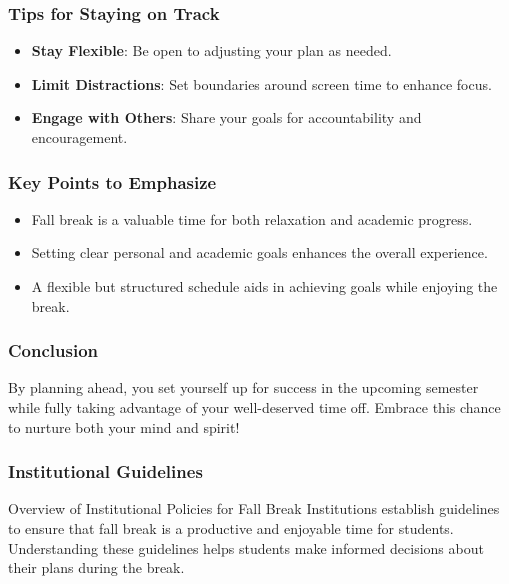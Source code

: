 \documentclass[aspectratio=169]{beamer}
\begin{document}
\begin{frame}[fragile]
    \frametitle{Tips for Staying on Track}
    \begin{itemize}
        \item \textbf{Stay Flexible}: Be open to adjusting your plan as needed.
        \item \textbf{Limit Distractions}: Set boundaries around screen time to enhance focus.
        \item \textbf{Engage with Others}: Share your goals for accountability and encouragement.
    \end{itemize}
\end{frame}

\begin{frame}[fragile]
    \frametitle{Key Points to Emphasize}
    \begin{itemize}
        \item Fall break is a valuable time for both relaxation and academic progress.
        \item Setting clear personal and academic goals enhances the overall experience.
        \item A flexible but structured schedule aids in achieving goals while enjoying the break.
    \end{itemize}
\end{frame}

\begin{frame}[fragile]
    \frametitle{Conclusion}
    By planning ahead, you set yourself up for success in the upcoming semester while fully taking advantage of your well-deserved time off. Embrace this chance to nurture both your mind and spirit!
\end{frame}

\begin{frame}[fragile]
    \frametitle{Institutional Guidelines}
    
    \begin{block}{Overview of Institutional Policies for Fall Break}
        Institutions establish guidelines to ensure that fall break is a productive and enjoyable time for students. Understanding these guidelines helps students make informed decisions about their plans during the break.
    \end{block}
\end{frame}
\end{document}
